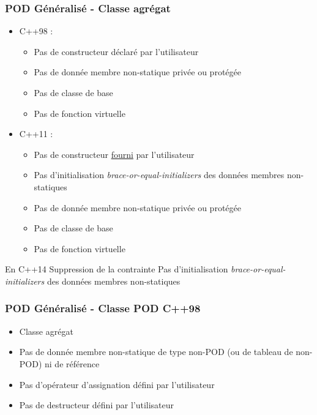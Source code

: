 \documentclass[C++.tex]{subfiles}
\begin{document}
\begin{frame}[fragile]
	\frametitle{POD Généralisé - Classe agrégat}
	\begin{itemize}
		\item C++98 : 
		\begin{itemize}
			\item Pas de constructeur déclaré par l'utilisateur
			\item Pas de donnée membre non-statique privée ou protégée
			\item Pas de classe de base
			\item Pas de fonction virtuelle
		\end{itemize}
		\item C++11 : 
		\begin{itemize}
			\item Pas de constructeur \underline{fourni} par l'utilisateur


			\item Pas d'initialisation \textit{brace-or-equal-initializers} des données membres non-statiques
			\item Pas de donnée membre non-statique privée ou protégée
			\item Pas de classe de base
			\item Pas de fonction virtuelle
		\end{itemize}
	\end{itemize}

	\begin{block}{En C++14}
		Suppression de la contrainte \og Pas d'initialisation \textit{brace-or-equal-initializers} des données membres non-statiques\fg{}
	\end{block}
\end{frame}

\begin{frame}[fragile]
	\frametitle{POD Généralisé - Classe POD C++98}
	\begin{itemize}
		\item Classe agrégat
		\item Pas de donnée membre non-statique de type non-POD (ou de tableau de non-POD) ni de référence
		\item Pas d'opérateur d'assignation défini par l'utilisateur
		\item Pas de destructeur défini par l'utilisateur
	\end{itemize}
\end{frame}
\end{document}

